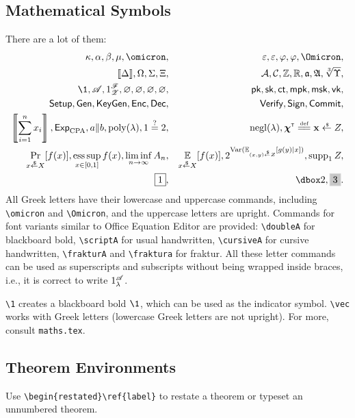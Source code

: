 \subsection{Mathematical Symbols}

There are a lot of them:
\begin{align*}
\kappa,\alpha,\beta,\mu,\omicron,&&
\epsilon,\varepsilon,\phi,\varphi,\Omicron,&\\
\llbracket\Delta\rrbracket,\Omega,\Sigma,\Xi,&&
\scriptA,\scriptC,\doubleZ,\doubleR,\fraktura,\frakturA,\cbrt\Upsilon,&\\
\1,\cursiveA,1^\cursiveF_\cursiveZ,\emptyset,\varnothing,\nothing,\varemptyset,&&
\pk,\sk,\ct,\mpk,\msk,\vk,\\
\Setup,\Gen,\KeyGen,\Enc,\Dec,&&
\Verify,\Sign,\Commit,\\
\left\llbracket\sum_{i=1}^{n}{x_i}\right\rrbracket,
\ExpCPA,a\concat b,\poly(\lambda),1\iseq 2,&&
\negl(\lambda),\vec{\chi}^\transpose\defeq\vec{x}\draws Z,\\
\Pr_{x\draws X}[f(x)],
\esssup_{x\in[0,1]}{f(x)},
\liminf_{n\to\infty}{A_n},&&
\EX_{x\draws X}[f(x)],2^{\Var({\EX_{(x,y)\draws Z}[g(y)|x]})},\supp_1 Z,\\
\boxed{1},&&
\dashboxed{2},\grayboxed{3}.
\end{align*}
All Greek letters have their lowercase and uppercase commands,
including \texttt{\textbackslash omicron} and \texttt{\textbackslash Omicron},
and the uppercase letters are upright.
Commands for font variants similar to Office Equation Editor are provided:
\texttt{\textbackslash doubleA}
for blackboard bold,
\texttt{\textbackslash scriptA}
for usual handwritten,
\texttt{\textbackslash cursiveA}
for cursive handwritten,
\texttt{\textbackslash frakturA} and \texttt{\textbackslash fraktura}
for fraktur.
All these letter commands
can be used as superscripts and subscripts
without being wrapped inside braces, i.e.,
it is correct to write $1^{\mathscr{A}}_\lambda$.

\texttt{\textbackslash 1} creates a blackboard bold $\1$,
which can be used as the indicator symbol.
\texttt{\textbackslash vec} works with Greek letters (lowercase Greek letters are not upright).
For more, consult \texttt{maths.tex}.

\subsection{Theorem Environments}

Use \texttt{\textbackslash begin\{restated\}{\textbackslash ref\{label\}}} to restate a theorem or typeset an unnumbered theorem.

